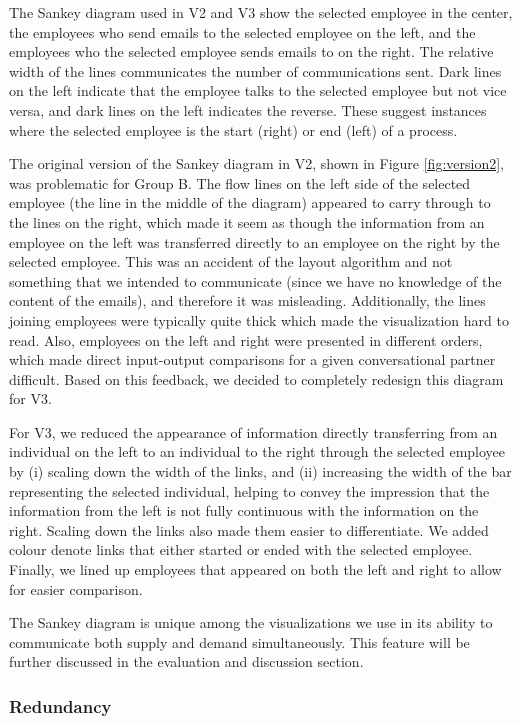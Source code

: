 \documentclass[journal]{vgtc}                %
\begin{document}
The Sankey diagram used in V2 and V3 show the selected employee in the center, the employees who send emails to the selected employee on the left, and the employees who the selected employee sends emails to on the right. The relative width of the lines communicates the number of communications sent. Dark lines on the left indicate that the employee talks to the selected employee but not vice versa, and dark lines on the left indicates the reverse. These suggest instances where the selected employee is the start (right) or end (left) of a process. 

The original version of the Sankey diagram in V2, shown in Figure \ref{fig:version2}, was problematic for Group B. The flow lines on the left side of the selected employee (the line in the middle of the diagram) appeared to carry through to the lines on the right, which made it seem as though the information from an employee on the left was transferred directly to an employee on the right by the selected employee. This was an accident of the layout algorithm and not something that we intended to communicate (since we have no knowledge of the content of the emails), and therefore it was misleading.  Additionally, the lines joining employees were typically quite thick which made the visualization hard to read. Also, employees on the left and right were presented in different orders, which made direct input-output comparisons for a given conversational partner difficult. Based on this feedback, we decided to completely redesign this diagram for V3.

For V3, we reduced the appearance of information directly transferring from an individual on the left to an individual to the right through the selected employee by (i) scaling down the width of the links, and (ii) increasing the width of the bar representing the selected individual, helping to convey the impression that the information from the left is not fully continuous with the information on the right.  Scaling down the links also made them easier to differentiate. We added colour denote links that either started or ended with the selected employee. Finally, we lined up employees that appeared on both the left and right to allow for easier comparison.

The Sankey diagram is unique among the visualizations we use in its ability to communicate both supply and demand simultaneously. This feature will be further discussed in the evaluation and discussion section.

\subsubsection{Redundancy}
\end{document}
